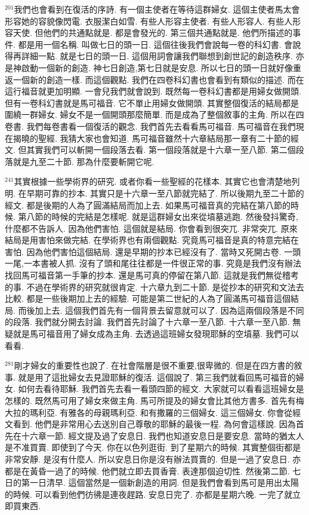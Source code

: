 \documentclass{book}
\begin{document}
$^{201}$我們也會看到在復活的序詩.
有一個主使者在等待這群婦女.
這個主使者馬太會形容她的容貌像閃電.
衣服潔白如雪.
有些人形容主使者.
有些人形容人.
有些人形容天使.
但他們的共通點就是.
都是會發光的.
第三個共通點就是.
他們所描述的事件.
都是用一個名稱.
叫做七日的頭一日.
這個往後我們會說每一卷的科幻書.
會說得再詳細一點.
就是七日的頭一日.
這個用詞會讓我們聯想到創世記的創造秩序.
亦是神啟動一個新的創造.
神七日創造,第七日就是安息.
所以七日的頭一日就好像重返一個新的創造一樣.
而這個觀點.
我們在四卷科幻書也會看到有類似的描述.
而在這行福音就更加明顯.
一會兒我們就會說到.
既然每一卷科幻書都是用婦女做開頭.
但有一卷科幻書就是馬可福音.
它不單止用婦女做開頭.
其實整個復活的結局都是圍繞一群婦女.
婦女不是一個開頭那麼簡單.
而是成為了整個敘事的主角.
所以在四卷書.
我們每卷書看一個復活的觀念.
我們首先去看看馬可福音.
馬可福音在我們現在揭曉的聖經.
我猜大家也會知道.
馬可福音雖然十六章結局那一章有二十節的經文.
但其實我們可以斬開一個段落去看.
第一個段落就是十六章一至八節.
第二個段落就是九至二十節.
那為什麼要斬開它呢.

$^{241}$其實根據一些學術界的研究.
或者你看一些聖經的花樣本.
其實它也會清楚地列明.
在早期可靠的抄本.
其實只是十六章一至八節就完結了.
所以後期九至二十節的經文.
都是後期的人為了圓滿結局而加上去.
如果馬可福音真的完結在第八節的時候.
第八節的時候的完結是怎樣呢.
就是這群婦女出來從墳墓逃跑.
然後發抖驚奇,什麼都不告訴人.
因為他們害怕.
這個就是結局.
你會看到很突兀.
非常突兀.
原來結局是用害怕來做完結.
在學術界也有兩個觀點.
究竟馬可福音是真的特意完結在害怕.
因為他們害怕這個結局.
還是早期的抄本已經沒有了.
當時又死開古卷.
一頭一尾,一本書被人抓.
沒有了頭和尾往往都是一件很正常的事.
究竟是我們沒有辦法找回馬可福音第一手筆的抄本.
還是馬可真的停留在第八節.
這就是我們無從稽考的事.
不過在學術界的研究就很肯定.
十六章九到二十節.
是從抄本的研究和文法去比較.
都是一些後期加上去的經驗.
可能是第二世紀的人為了圓滿馬可福音這個結局.
而後加上去.
這個我們首先有一個背景去留意就可以了.
因為這兩個段落是不同的段落.
我們就分開去討論.
我們首先討論了十六章一至八節.
十六章一至八節.
無疑就是馬可福音用了婦女成為主角.
去透過這班婦女發現耶穌的空墳墓.
我們可以看看.

$^{281}$剛才婦女的重要性也說了.
在社會階層是很不重要,很卑微的.
但是在四方書的敘事.
就是用了這批婦女去見證耶穌的復活.
這個說了.
第三我們就看回馬可福音的婦女.
如何去看待耶穌.
我們首先去看一看頭四節的經文.
大家就可以看看這班婦女是怎樣的.
既然馬可用了婦女來做主角.
馬可所提及的婦女會比其他方書多.
首先有梅大拉的瑪利亞.
有雅各的母親瑪利亞.
和有撒羅的三個婦女.
這三個婦女.
你會從經文看到.
他們是非常用心去送別自己尊敬的耶穌的最後一程.
為何會這樣說.
因為首先在十六章一節.
經文提及過了安息日.
我們也知道安息日是要安息.
當時的猶太人是不准買賣.
即使到了今天.
你在以色列逛街.
到了星期六的時候.
其實整個街都是非常安靜.
是沒有什麼人.
所以安息日你是沒有辦法買賣的.
但是一過了安息日.
亦都是在黃昏一過了的時候.
他們就立即去買香膏.
表達那個迫切性.
然後第二節.
七日的第一日清早.
這個當然是一個新創造的用詞.
但是我們會看到馬可是用出太陽的時候.
可以看到他們彷彿是連夜趕路.
安息日完了.
亦都是星期六晚.
一完了就立即買東西.
\end{document}
